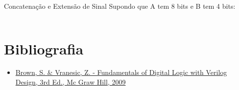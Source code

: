 \begin{frame}{Concatenação e Extensão de Sinal}
    Supondo que A tem 8 bits e B tem 4 bits: \\
    \smallskip \\
\end{frame}

\section{Bibliografia} %

\begin{frame}{\insertsection} 
	\begin{itemize}
		\item \href{https://www.google.com.br/search?q=filetype\%3Apdf+Fundamentals+of+Digital+Logic+with+Verilog+Design+&oq=filetype\%3Apdf}{Brown, S. \& Vranesic, Z. - Fundamentals of Digital Logic with Verilog Design, 3rd Ed., Mc Graw Hill, 2009}
	\end{itemize}
\end{frame}

\begin{frame}
	\titlepage
\end{frame} 

